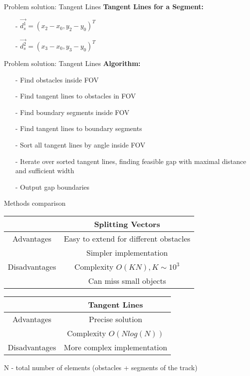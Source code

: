 \begin{frame}{Problem solution: Tangent Lines}
    \vspace{0.75cm}
    \textbf{\large Tangent Lines for a Segment:}
    \begin{itemize}
      \item[-] $\vec{d_s^1} = (x_2 - x_0, y_2 - y_0)^T$
      \item[-] $\vec{d_s^2} = (x_3 - x_0, y_3 - y_0)^T$
    \end{itemize}
    
    \end{frame}
    
    \begin{frame}{Problem solution: Tangent Lines}
    \textbf{\large Algorithm:}
    \begin{itemize}
      \item[-] Find obstacles inside FOV
      \item[-] Find tangent lines to obstacles in FOV
      \item[-] Find boundary segments inside FOV
      \item[-] Find tangent lines to boundary segments
      \item[-] Sort all tangent lines by angle inside FOV
      \item[-] Iterate over sorted tangent lines, finding feasible gap with maximal distance and sufficient width
      \item[-] Output gap boundaries
    \end{itemize}
    \end{frame}
    
    \begin{frame}{Methods comparison}
    \begin{tabular}{ |c|c| }
    \hline
     & Splitting Vectors \\
    \hline
        Advantages & Easy to extend for different obstacles \\ 
                   & Simpler implementation                 \\
    \hline
        Disadvantages & Complexity $O(KN), K \sim 10^3$     \\
                      & Can miss small objects \\
    \hline
    \end{tabular}
    
    \vspace{1cm}
    \begin{tabular}{ |c|c| }
    \hline
        & Tangent Lines \\
    \hline
        Advantages & Precise solution \\ 
                   & Complexity $O(N log(N))$ \\
    \hline
        Disadvantages & More complex implementation \\ 
    \hline
    \end{tabular}
    
    \vspace{1cm}
    N - total number of elements (obstacles + segments of the track)
    \end{frame}
    
